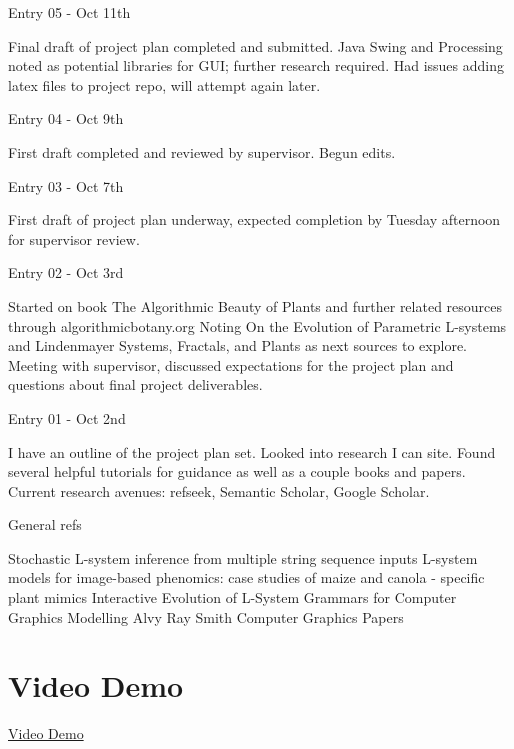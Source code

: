 \documentclass[]{final_report}
\begin{document}
Entry 05 - Oct 11th

Final draft of project plan completed and submitted. Java Swing and Processing noted as potential libraries for GUI; further research required. Had issues adding latex files to project repo, will attempt again later.

Entry 04 - Oct 9th

First draft completed and reviewed by supervisor. Begun edits.

Entry 03 - Oct 7th

First draft of project plan underway, expected completion by Tuesday afternoon for supervisor review.

Entry 02 - Oct 3rd

Started on book The Algorithmic Beauty of Plants and further related resources through algorithmicbotany.org
Noting On the Evolution of Parametric L-systems and Lindenmayer Systems, Fractals, and Plants as next sources to explore.
Meeting with supervisor, discussed expectations for the project plan and questions about final project deliverables.

Entry 01 - Oct 2nd

I have an outline of the project plan set. Looked into research I can site. Found several helpful tutorials for guidance as well as a couple books and papers. Current research avenues: refseek, Semantic Scholar, Google Scholar.



General refs

Stochastic L-system inference from multiple string sequence inputs
L-system models for image-based phenomics: case studies of maize and canola - specific plant mimics
Interactive Evolution of L-System Grammars for Computer Graphics Modelling
Alvy Ray Smith Computer Graphics Papers

\section{Video Demo}

\href{https://youtu.be/6ORPsUCSY50}{Video Demo}
\end{document}
